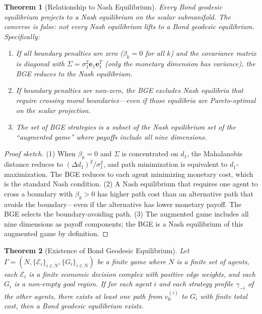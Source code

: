 \documentclass[12pt]{article}
\newtheorem{theorem}{Theorem}[section]
\theoremstyle{definition}
\theoremstyle{remark}
\newcommand{\E}{\mathcal{E}}               %
\begin{document}
\begin{theorem}[Relationship to Nash Equilibrium]
\label{thm:nash_relationship}
Every Bond geodesic equilibrium projects to a Nash equilibrium on the scalar submanifold.  The converse is false: not every Nash equilibrium lifts to a Bond geodesic equilibrium.  Specifically:
\begin{enumerate}
    \item If all boundary penalties are zero ($\beta_k = 0$ for all $k$) and the covariance matrix is diagonal with $\Sigma = \sigma_1^2 \mathbf{e}_1 \mathbf{e}_1^T$ (only the monetary dimension has variance), the BGE reduces to the Nash equilibrium.
    \item If boundary penalties are non-zero, the BGE excludes Nash equilibria that require crossing moral boundaries---even if those equilibria are Pareto-optimal on the scalar projection.
    \item The set of BGE strategies is a subset of the Nash equilibrium set of the ``augmented game'' where payoffs include all nine dimensions.
\end{enumerate}
\end{theorem}

\begin{proof}[Proof sketch]
(1) When $\beta_k = 0$ and $\Sigma$ is concentrated on $d_1$, the Mahalanobis distance reduces to $(\Delta d_1)^2 / \sigma_1^2$, and path minimization is equivalent to $d_1$-maximization.  The BGE reduces to each agent minimizing monetary cost, which is the standard Nash condition.  (2) A Nash equilibrium that requires one agent to cross a boundary with $\beta_k > 0$ has higher path cost than an alternative path that avoids the boundary---even if the alternative has lower monetary payoff.  The BGE selects the boundary-avoiding path.  (3) The augmented game includes all nine dimensions as payoff components; the BGE is a Nash equilibrium of this augmented game by definition.
\end{proof}

\begin{theorem}[Existence of Bond Geodesic Equilibrium]
\label{thm:bge_existence}
Let $\Gamma = (N, \{\E_i\}_{i \in N}, \{G_i\}_{i \in N})$ be a finite game where $N$ is a finite set of agents, each $\E_i$ is a finite economic decision complex with positive edge weights, and each $G_i$ is a non-empty goal region.  If for each agent $i$ and each strategy profile $\gamma_{-i}$ of the other agents, there exists at least one path from $v_0^{(i)}$ to $G_i$ with finite total cost, then a Bond geodesic equilibrium exists.
\end{theorem}
\end{document}

